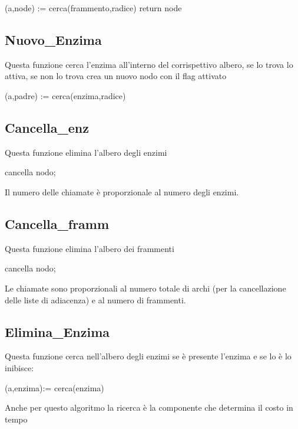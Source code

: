 \documentclass[a4paper,10pt]{article}
\begin{document}
\begin{algorithm}[H]
(a,node) := cerca(frammento,radice)\;
return node\;
\end{algorithm}
\subsection{Nuovo\_{}Enzima}
Questa funzione cerca l'enzima all'interno del corrispettivo albero, se lo trova lo attiva, se non lo trova crea un nuovo nodo con il flag attivato

\begin{algorithm}[H]
(a,padre) := cerca(enzima,radice)\;
\end{algorithm}
\subsection{Cancella\_{}enz}
Questa funzione elimina l'albero degli enzimi

\begin{algorithm}[H]
cancella nodo;
\end{algorithm}
Il numero delle chiamate è proporzionale al numero degli enzimi.
\subsection{Cancella\_{}framm}
Questa funzione elimina l'albero dei frammenti

\begin{algorithm}[H]
cancella nodo;
\end{algorithm}
Le chiamate sono proporzionali al numero totale di archi (per la cancellazione delle liste di adiacenza) e al numero di frammenti.
\subsection{Elimina\_{}Enzima}
Questa funzione cerca nell'albero degli enzimi se è presente l'enzima e se lo è lo inibisce:

\begin{algorithm}[H]
(a,enzima):= cerca(enzima)\;
\end{algorithm}
Anche per questo algoritmo la ricerca è la componente che determina il costo in tempo
\end{document}
